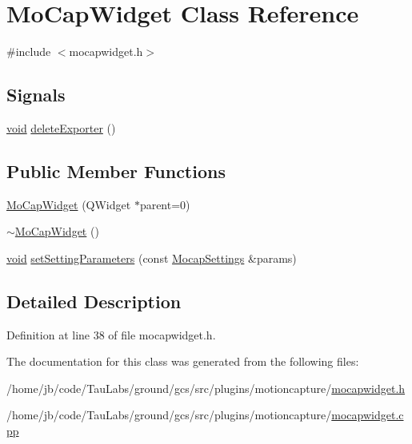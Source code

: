 \hypertarget{class_mo_cap_widget}{\section{\-Mo\-Cap\-Widget \-Class \-Reference}
\label{class_mo_cap_widget}
}


{\ttfamily \#include $<$mocapwidget.\-h$>$}

\subsection*{\-Signals}
\begin{DoxyCompactItemize}
\item 
\hyperlink{group___u_a_v_objects_plugin_ga444cf2ff3f0ecbe028adce838d373f5c}{void} \hyperlink{group___mo_cap_plugin_ga34afe7fdc30edaad2ec82fdb72275fa8}{delete\-Exporter} ()
\end{DoxyCompactItemize}
\subsection*{\-Public \-Member \-Functions}
\begin{DoxyCompactItemize}
\item 
\hyperlink{group___mo_cap_plugin_ga36cbb83db56d6d7eb8f5d30717d2c5e4}{\-Mo\-Cap\-Widget} (\-Q\-Widget $\ast$parent=0)
\item 
\hyperlink{group___mo_cap_plugin_gae095eb46b9b054f9601f677e9d82ad49}{$\sim$\-Mo\-Cap\-Widget} ()
\item 
\hyperlink{group___u_a_v_objects_plugin_ga444cf2ff3f0ecbe028adce838d373f5c}{void} \hyperlink{group___mo_cap_plugin_ga49fc96a517fa87b95341072a5bacd7f9}{set\-Setting\-Parameters} (const \hyperlink{group___mo_cap_plugin_ga6083347a5b3eb70e360f599354dc0f0b}{\-Mocap\-Settings} \&params)
\end{DoxyCompactItemize}


\subsection{\-Detailed \-Description}


\-Definition at line 38 of file mocapwidget.\-h.



\-The documentation for this class was generated from the following files\-:\begin{DoxyCompactItemize}
\item 
/home/jb/code/\-Tau\-Labs/ground/gcs/src/plugins/motioncapture/\hyperlink{mocapwidget_8h}{mocapwidget.\-h}\item 
/home/jb/code/\-Tau\-Labs/ground/gcs/src/plugins/motioncapture/\hyperlink{mocapwidget_8cpp}{mocapwidget.\-cpp}\end{DoxyCompactItemize}
